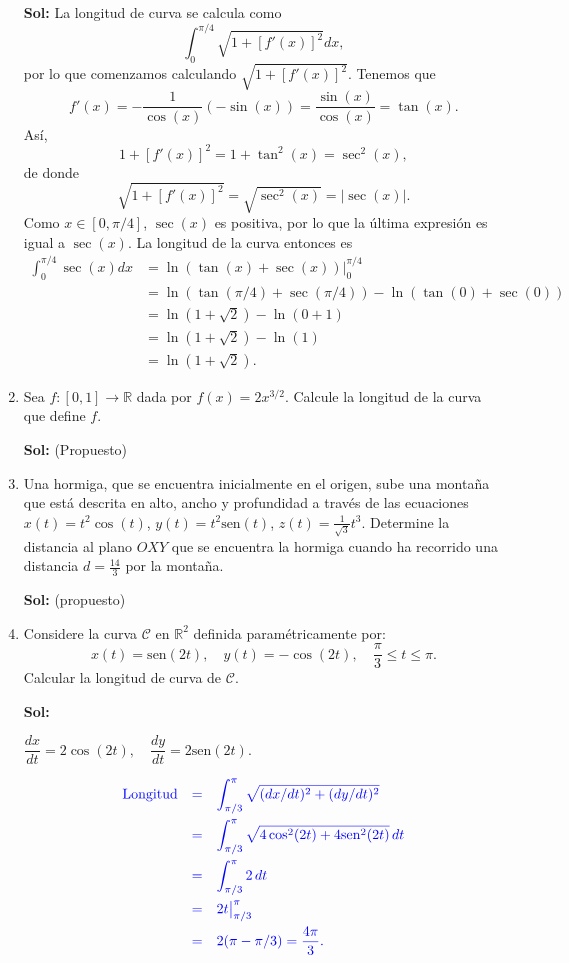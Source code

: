 \documentclass[letterpaper,12pt]{article}
\theoremstyle{plain}
\theoremstyle{definition}
\newcommand{\sen}{\text{sen}}
\begin{document}
\begin{enumerate}
\color{blue}
\textbf{Sol:} La longitud de curva se calcula como
\[
\int_{0}^{\pi/4} \sqrt{1 + [f'(x)]^2} dx,
\]
por lo que comenzamos calculando $\sqrt{1 + [f'(x)]^2}$. Tenemos que
\[
f'(x) = -\frac{1}{\cos(x)}(-\sin(x)) = \frac{\sin(x)}{\cos(x)} = \tan(x).
\]
Así,
\[
1 + [f'(x)]^2 = 1 + \tan^2(x) = \sec^2(x),
\]
de donde
\[
\sqrt{1 + [f'(x)]^2} = \sqrt{\sec^2(x)} = |\sec(x)|.
\]
Como $x \in [0, \pi/4]$, $\sec(x)$ es positiva, por lo que la última expresión es igual a $\sec(x)$.
La longitud de la curva entonces es
\begin{align*}
\int_{0}^{\pi/4} \sec(x) dx &= \ln(\tan(x) + \sec(x)) \bigg|_{0}^{\pi/4} \\
&= \ln(\tan(\pi/4) + \sec(\pi/4)) - \ln(\tan(0) + \sec(0)) \\
&= \ln(1 + \sqrt{2}) - \ln(0 + 1) \\
&= \ln(1 + \sqrt{2}) - \ln(1) \\
&= \ln(1 + \sqrt{2}).
\end{align*}
\color{black}

\item Sea \( f : [0, 1] \rightarrow \mathbb{R} \) dada por
$\displaystyle
f(x) = 2x^{3/2}.
$
Calcule la longitud de la curva que define \( f \).

\color{blue}
\textbf{Sol:} (Propuesto)
\color{black}

\item Una hormiga, que se encuentra inicialmente en el origen, sube una montaña que está descrita en alto, ancho y profundidad a través de las ecuaciones $x(t) = t^2 \cos(t)$, $y(t) = t^2 \sen(t)$, $z(t) = \frac{1}{\sqrt{3}}t^3$. Determine la distancia al plano $OXY$ que se encuentra la hormiga cuando ha recorrido una distancia $d = \frac{14}{3}$ por la montaña.

\color{blue}
\textbf{Sol:} (propuesto)
\color{black}
    


\item Considere la curva $\mathcal{C}$ en $\mathbb{R}^{2}$ definida param\'etricamente por:
$$ x(t) = \sen(2t), \quad y(t) = -\cos(2t), \quad \frac{\pi}{3} \leq t \leq \pi. $$
Calcular la longitud de curva de $\mathcal{C}$.

\noindent \textbf{\color{blue}Sol:}
\begin{center}
    {\color{blue}
    $\dfrac{dx}{dt} = 2 \cos(2t), \quad \dfrac{dy}{dt} = 2 \sen(2t).$
    }
\end{center}
\begin{align*}
{\color{blue}\text{Longitud}} \quad {\color{blue}=} &\quad {\color{blue} \int_{\pi/3}^{\pi} \sqrt{(dx/dt)^2 + (dy/dt)^2} } \\
{\color{blue}=} &\quad {\color{blue} \int_{\pi/3}^{\pi} \sqrt{4 \cos^2(2t) + 4 \sen^2(2t)} \, dt } \\
{\color{blue}=} &\quad {\color{blue} \int_{\pi/3}^{\pi} 2 \, dt } \\
{\color{blue}=} &\quad {\color{blue} 2t \big|_{\pi/3}^{\pi} } \\
{\color{blue}=} &\quad {\color{blue} 2(\pi - \pi/3) = \frac{4\pi}{3}. }
\end{align*}


\end{enumerate}
\end{document}
